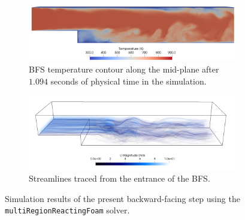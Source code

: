 \begin{figure}
  \begin{subfigure}{1\textwidth}
  \includegraphics[width=\linewidth]{figures/ch4/BFS_temperature.png}
  \caption{BFS temperature contour along the mid-plane after $1.094$ seconds of physical time in the simulation. }
  \label{fig:BFS_temperature}
  \end{subfigure}
  \begin{subfigure}{1\textwidth}
  \includegraphics[width=\linewidth]{figures/ch4/BFS_streamlines6.png}
  \caption{Streamlines traced from the entrance of the BFS.}
  \label{fig:BFS_streamlines}
  \end{subfigure}
  \caption{Simulation results of the present backward-facing step using the \texttt{multiRegionReactingFoam} solver.}
  \label{fig:BFS_contours}
\end{figure}

